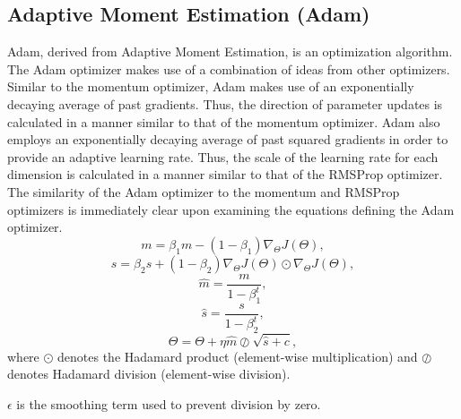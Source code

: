 \subsection{Adaptive Moment Estimation (Adam)}
Adam, derived from Adaptive Moment Estimation, is an optimization algorithm.
The Adam optimizer makes use of a combination of ideas from other optimizers.
Similar to the momentum optimizer, Adam makes use of an exponentially decaying average of 
past gradients.
Thus, the direction of parameter updates is calculated in a manner similar to that of
the momentum optimizer.
Adam also employs an exponentially decaying average of past squared gradients in order to
provide an adaptive learning rate. 
Thus, the scale of the learning rate for each dimension is calculated in a manner similar to 
that of the RMSProp optimizer.
The similarity of the Adam optimizer to the momentum and RMSProp optimizers is
immediately clear upon examining the equations defining the Adam optimizer.
\begin{equation}
	m = \beta_{1}m - (1-\beta_{1})\nabla_{\Theta}J(\Theta),
\end{equation}
\begin{equation}
	s = \beta_{2}s+(1-\beta_{2})\nabla_{\Theta}J(\Theta)\odot \nabla_{\Theta}J(\Theta),
\end{equation}
\begin{equation}
	\hat{m} = \frac{m}{1-\beta^{t}_{1}},
\end{equation}
\begin{equation}
	\hat{s} = \frac{s}{1-\beta^{t}_{2}},
\end{equation}
\begin{equation}
	\Theta = \Theta + \eta \hat{m} \oslash \sqrt{\hat{s}+c},
\end{equation}
where $\odot$ denotes the Hadamard product (element-wise multiplication) and $\oslash$ denotes
Hadamard division (element-wise division).

$\epsilon$ is the smoothing term used to prevent division by zero.

